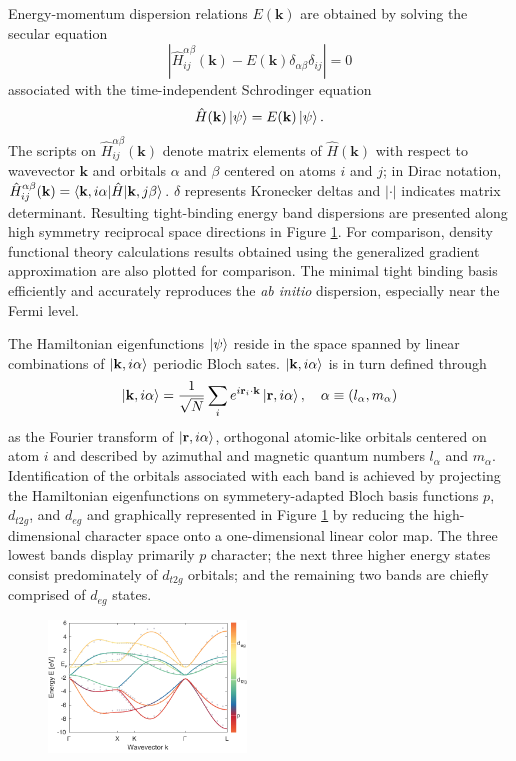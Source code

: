 \documentclass[twocolumn,showpacs,preprintnumbers,superscriptaddress,prb,floatfix,aps,10pt]{revtex4-1}
\renewcommand{\vec}[1]{\ensuremath{\mathbf{#1}}}
\newcommand*{\ham}{\hat{H}}
\newcommand*{\bloch}{\ket{\vec{k}, i\alpha}}
\newcommand*{\lowdin}{\ket{\vec{r}, i\alpha}}
\begin{document}
Energy-momentum dispersion relations $E(\vec{k})$ are obtained by solving the secular equation
\begin{equation}
\label{eq:secular}
\left| \ham^{\alpha\beta}_{ij}(\vec{k}) - E(\vec{k})\delta_{\alpha\beta}\delta_{ij} \right| = 0
\end{equation}
%
associated with the time-independent Schrodinger equation 
%
\begin{equation}
\label{eq:schrodinger}
\hat{H}(\vec{k}) \ket{\psi} = E(\vec{k}) \ket{\psi}.
\end{equation}
%
The scripts on $\ham^{\alpha\beta}_{ij}(\vec{k})$ denote matrix elements of $\ham(\vec{k})$ with respect to wavevector $\vec{k}$ and orbitals $\alpha$ and $\beta$ centered on atoms $i$ and $j$; in Dirac notation, $\ham^{\alpha\beta}_{ij}(\vec{k}) = \braket{\vec{k},i\alpha | \ham | \vec{k},j\beta}$. $\delta$ represents Kronecker deltas and $|\cdot |$ indicates matrix determinant. Resulting tight-binding energy band dispersions are presented along high symmetry reciprocal space directions in Figure \ref{fig:dispersion}. For comparison, density functional theory calculations results obtained using the generalized gradient approximation are also plotted for comparison. The minimal tight binding basis efficiently and accurately reproduces the \emph{ab initio} dispersion, especially near the Fermi level. 

The Hamiltonian eigenfunctions $\ket{\psi}$ reside in the space spanned by linear combinations of $\bloch$ periodic Bloch sates. $\bloch$ is in turn defined through 
\begin{equation}
\label{eq:bloch}
\bloch = \frac{1}{\sqrt{N}} \sum_i e^{i\vec{r}_i\cdot\vec{k}} \lowdin, 
\quad
\alpha \equiv (l_\alpha,m_\alpha)
\end{equation}
as the Fourier transform of $\lowdin$, orthogonal atomic-like orbitals centered on atom $i$ and described by azimuthal and magnetic quantum numbers $l_\alpha$ and $m_\alpha$. Identification of the orbitals associated with each band is achieved by projecting the Hamiltonian eigenfunctions on symmetery-adapted Bloch basis functions $p$, $d_{t2g}$, and $d_{eg}$ and graphically represented in Figure \ref{fig:dispersion} by reducing the high-dimensional character space onto a one-dimensional linear color map. The three lowest bands display primarily $p$ character; the next three higher energy states consist predominately of $d_{t2g}$ orbitals; and the remaining two bands are chiefly comprised of $d_{eg}$ states.
%
\begin{figure}[h]
\includegraphics[width=0.47\textwidth]{Figure_1_bands.pdf}
\caption[LRC circuit response.]{\label{fig:dispersion} }
\end{figure}
\end{document}
